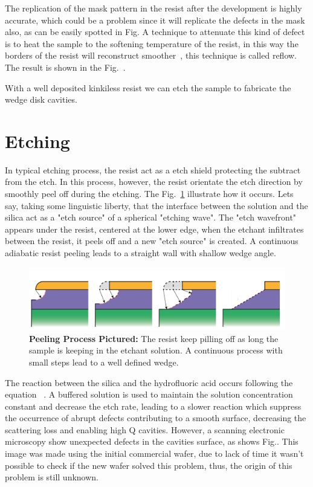 The replication of the mask pattern in the resist after the development is highly accurate, which could be a problem since it will replicate the defects in the mask also, as can be easily spotted in Fig. A technique to attenuate this kind of defect is to heat the sample to the softening temperature of the resist, in this way the borders of the resist will reconstruct smoother~\needcit, this technique is called reflow. The result is shown in the Fig.~.

With a well deposited kinkiless resist we can etch the sample to fabricate the wedge disk cavities. 

\section{Etching}

In typical etching process, the resist act as a etch shield protecting the subtract from the etch. In this process, however, the resist orientate the etch direction by smoothly peel off during the etching. The Fig.~\ref{fig:wedeg_grow} illustrate how it occurs. Lets say, taking some linguistic liberty, that the interface between the solution and the silica act as a "etch source" of a spherical "etching wave". The "etch wavefront" appears under the resist, centered at the lower edge, when the etchant infiltrates between the resist, it peels off and a new "etch source" is created. A continuous adiabatic resist peeling leads to a straight wall with shallow wedge angle. %

\begin{figure}[!ht]
    \centering
    \includegraphics[width = 16cm]{figuras/Dissertation_etching.jpg}
    \caption{\textbf{Peeling Process Pictured:} The resist keep pilling off as long the sample is keeping in the etchant solution. A continuous process with small steps lead to a well defined wedge.}
    \label{fig:wedeg_grow}
\end{figure}

The reaction between the silica and the hydrofluoric acid occurs following the equation~\cite{Kang_2002} 
.
A buffered solution is used to maintain the solution concentration constant and decrease the etch rate, leading to a slower reaction which suppress the occurrence of abrupt defects contributing to a smooth surface, decreasing the scattering loss and enabling high Q cavities. However, a scanning electronic microscopy show unexpected defects in the cavities surface, as shows Fig.. This image was made using the initial commercial wafer, due to lack of time it wasn't possible to check if the new wafer solved this problem, thus, the origin of this problem is still unknown. 

